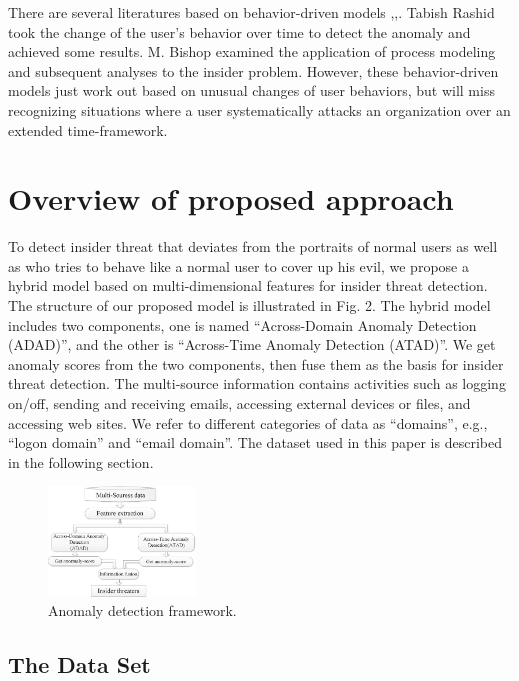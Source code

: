 \documentclass[conference]{IEEEtran}
\begin{document}
There are several literatures based on behavior-driven models \cite{b7},\cite{b11},\cite{b12}. 
Tabish Rashid \cite{b17} took the change of the user's behavior over time to detect the anomaly and achieved some results. M. Bishop \cite{b11} examined the application of process modeling
and subsequent analyses to the insider problem. 
However, these behavior-driven models just work out based on unusual changes of user behaviors, but will miss recognizing situations where a user systematically attacks an organization over an extended time-framework.



\section{Overview of proposed approach}
To detect insider threat that deviates from the portraits of normal users as well as who tries to behave like a normal user to cover up his evil,
we propose a hybrid model based on multi-dimensional features for insider threat detection. The structure of our proposed model is illustrated in Fig. 2. The hybrid model includes two components, one is named ``Across-Domain Anomaly Detection (ADAD)'', and the other is ``Across-Time Anomaly Detection (ATAD)''. We get anomaly scores from the two components, then fuse them as the basis for insider threat detection.  The multi-source information contains activities such as logging on/off, sending and receiving emails, accessing external devices or files, and
accessing web sites. We refer to different categories of data as “domains”, e.g., “logon domain” and “email domain”. The dataset used in this paper is described in the following section. 


\begin{figure}[htb]
\centerline{\includegraphics[width = 0.35\textwidth]{figure/figure2.eps}}
\caption{Anomaly detection framework.}
\label{fig}
\end{figure}

\subsection{The Data Set}
\end{document}
